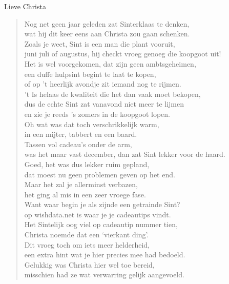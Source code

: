 \documentclass[12pt]{brief}
\date{12 augustus 2006}
\begin{document}
\begin{letter}{Lieve Christa}

\opening{}


\begin{verse}

Nog net geen jaar geleden zat Sinterklaas te denken,\\
wat hij dit keer eens aan Christa zou gaan schenken.\\
Zoals je weet, Sint is een man die plant vooruit,\\
juni juli of augustus, hij checkt vroeg genoeg die koopgoot uit!\\[1.5em]

Het is wel voorgekomen, dat zijn geen ambtsgeheimen,\\
een duffe hulpsint begint te laat te kopen,\\
of op 't heerlijk avondje zit iemand nog te rijmen.\\
't Is helaas de kwaliteit die het dan vaak moet bekopen,\\
dus de echte Sint zat vanavond niet meer te lijmen\\
en zie je reeds 's zomers in de koopgoot lopen.\\[1.5em]

Oh wat was dat toch verschrikkelijk warm,\\
in een mijter, tabbert en een baard.\\
Tassen vol cadeau's onder de arm,\\
was het maar vast december, dan zat Sint lekker voor de haard.\\[1.5em]

Goed, het was dus lekker ruim gepland,\\
dat moest nu geen problemen geven op het end.\\
Maar het zal je allerminst verbazen,\\
het ging al mis in een zeer vroege fase.\\[1.5em]

Want waar begin je als zijnde een getrainde Sint?\\
op wishdata.net is waar je je cadeautips vindt.\\
Het Sintelijk oog viel op cadeautip nummer tien,\\
Christa noemde dat een `vierkant ding'.\\[1.5em]

Dit vroeg toch om iets meer helderheid,\\
een extra hint wat je hier precies mee had bedoeld.\\
Gelukkig was Christa hier wel toe bereid,\\
misschien had ze wat verwarring gelijk aangevoeld.\\[1.5em]


\end{verse}
\end{letter}
\end{document}

